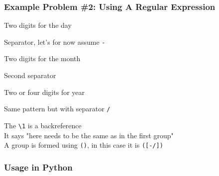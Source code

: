 \begin{frame}
  \frametitle{Example Problem \#2: Using A Regular Expression}
  \begin{center}\ttfamily
  \end{center}
  \vskip5mm
  \vskip2mm
  \begin{overprint}
    \begin{center}
      Two digits for the day
    \end{center}
    \begin{center}
      Separator, let's for now assume \texttt{-}
    \end{center}
    \begin{center}
      Two digits for the month
    \end{center}
    \begin{center}
      Second separator
    \end{center}
    \begin{center}
      Two or four digits for year
    \end{center}
    \begin{center}
      Same pattern but with separator \texttt{/}
    \end{center}
    \begin{center}
      The \texttt{\textbackslash1} is a backreference \\
      It says "here needs to be the same as in the first group" \\
      A group is formed using \texttt{()}, in this case it is \texttt{([-/])}
    \end{center}
  \end{overprint}
\end{frame}

\begin{frame}
  \frametitle{Usage in Python}
\end{frame}
